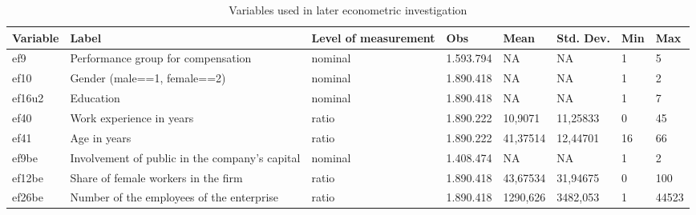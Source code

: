 \begin{landscape}
\begin{table}[p]
\scriptsize
\centering
\caption{Variables used in later econometric investigation}
\label{var}
\begin{tabular}{|l|l|l|l|l|l|l|l|}
\hline
\textbf{Variable} & \textbf{Label}                                 & \textbf{Level of measurement} & \textbf{Obs} & \textbf{Mean} & \textbf{Std. Dev.} & \textbf{Min} & \textbf{Max} \\ \hline
ef9               & Performance group for compensation             & nominal                       & 1.593.794    & NA            & NA                 & 1            & 5            \\ \hline
ef10              & Gender (male==1, female==2)                    & nominal                       & 1.890.418    & NA            & NA                 & 1            & 2            \\ \hline
ef16u2            & Education                                      & nominal                       & 1.890.418    & NA            & NA                 & 1            & 7            \\ \hline
ef40              & Work experience in years                       & ratio                         & 1.890.222    & 10,9071       & 11,25833           & 0            & 45           \\ \hline
ef41              & Age in years                                   & ratio                         & 1.890.222    & 41,37514      & 12,44701           & 16           & 66           \\ \hline
ef9be             & Involvement of public in the company's capital & nominal                       & 1.408.474    & NA            & NA                 & 1            & 2            \\ \hline
ef12be            & Share of female workers in the firm            & ratio                         & 1.890.418    & 43,67534      & 31,94675           & 0            & 100          \\ \hline
ef26be            & Number of the employees of the enterprise      & ratio                         & 1.890.418    & 1290,626      & 3482,053           & 1            & 44523        \\ \hline
\end{tabular}

\end{table}
\end{landscape}



